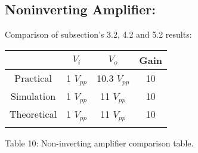 \subsection{Noninverting Amplifier:}

Comparison of subsection's 3.2, 4.2 and 5.2 results: \hfill \break

\begin{center}
\begin{tabular}[.5cm]{c c c c}
\toprule
\toprule
& \hspace{50pt} $V_{i}$ \hspace{50pt} & \hspace{50pt} $V_{o}$ \hspace{50pt} & \hspace{50pt}  {\bfseries Gain} \hspace{50pt}  \\
\midrule
\midrule
Practical & 1 $V_{pp}$ & 10.3 $V_{pp}$ & 10 \\
\cmidrule{1-4}
Simulation & 1 $V_{pp}$ & 11 $V_{pp}$ & 10 \\
\cmidrule{1-4}
Theoretical & 1 $V_{pp}$ & 11 $V_{pp}$ & 10 \\
\bottomrule
\linebreak
\end{tabular}
\linebreak Table 10: Non-inverting amplifier comparison table.
\end{center}
